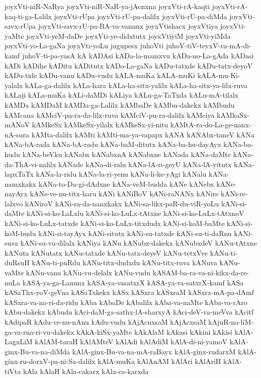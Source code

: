 {joyxVti-niR-NaRya
joyxVti-niR-NaR-ya-jAcnxna
joyxVti-rA-kaqti
joyxVti-rA-kaq-ti-ga-Lalilx
joyxVti-rUpa
joyxVti-rU-pa-dalilx
joyxVti-rU-pa-diMda
joyxVti-savx-rUpa
joyxVti-savx-rU-pa-BA-va-vanunx
joyxVtishacx
joyxVtiya
joyxVti-yaMte
joyxVti-yeM-daDe
joyxVti-ye-didxtutx
joyxVtiyiM
joyxVti-yiMda
joyxVti-yo-La-gaNa
joyxVti-yoLu
jugupesx
juhoVti
juhoV-tiV-teyxV-va-mA-di-kamf
juhoV-ti-pa-yasA
kA
kADAsi
kADa-la-mamxvu
kADa-no-La-gAda
kADasi
kADi
kADihe
kADitu
kADitutx
kADo-La-gaNa
kADu-tatxde
kADu-tatx-deyoV
kADu-tide
kADu-vanu
kADu-vudu
kALA-muKa
kALA-muKi
kALA-mu-Ki-yalalx
kALa-ga-dalilx
kALa-hara
kALa-ha-sitx-yalilx
kALa-ha-sitx-ya-lilx-ruva
kALaji
kALa-muKa
kALi-daMDi
kALiya
kALu-ga-TaTxda
kALu-mA-tilalx
kAMDa
kAMDaM
kAMDa-ga-Lalilx
kAMbaDe
kAMbu-dakekx
kAMbudu
kAMcana
kAMciV-pa-ra-da-lilx-ruva
kAMciV-pu-ra-dalilx
kAMciya
kAMkaSx-mANoV
kAMkeSx
kAMkeSx-yilalx
kAMkeSx-yi-nitu
kAMtA-ra-do-La-ge-nanx-nA-sura
kAMta-dalilx
kAMti
kAMti-ma-ya-vapapx
kANA
kANAbx-taneV
kANa
kANa-bA-rada
kANa-bA-radu
kANa-baM-ditutx
kANa-ba-hu-dayAyx
kANa-ba-hudu
kANa-beVku
kANabx
kANabxnA
kANabxne
kANada
kANa-daMte
kANa-da-ThA-vi-nalilx
kANade
kANa-di-ralu
kANa-lA-ri-geyU
kANa-lA-yitutx
kANa-lapxTaTx
kANa-la-ridu
kANa-la-ri-yenu
kANa-li-ke-yAgi
kANalu
kANa-namxkakx
kANa-to-Da-gi-dAdxne
kANa-veM-budda
kANe
kANebx
kANe-nayAyx
kANe-ve-nu-titx-haru
kANi
kANiBoV
kANi-raNANx
kANire
kANi-re-lalxvo
kANiroV
kANi-sa-da-nanxkakx
kANi-sa-likx-paR-du-viR-yoLu
kANi-si-daMte
kANi-si-ko-LaLxlu
kANi-si-ko-LuLx-tAtxne
kANi-si-ko-LuLx-tAtxnoV
kANi-si-ko-LuLx-tatxde
kANi-si-ko-LuLx-titxdudx
kANi-si-koM-baMte
kANi-si-koM-budu
kANi-si-tayAyx
kANi-situtx
kANi-su-tatxde
kANi-su-ti-daRnu
kANi-suva
kANi-su-vu-dilalx
kANiya
kANu
kANubx-dakekx
kANubxdeV
kANu-tAtxne
kANuta
kANutatx
kANu-tatxde
kANu-tatx-deyeV
kANu-tetxVve
kANu-ti-duRsuH
kANu-ti-puRdu
kANu-titx-dudxdu
kANu-titx-ruva
kANuva
kANu-vaMte
kANu-vanu
kANu-vu-delalx
kANu-vudu
kASAM-ba-ra-va-ni-kikx-da-re-nuLa
kASA-ya-ga-Lanunx
kASA-ya-vasatxrX
kASA-ya-va-satxrX-kamf
kASa
kASaThx-yoV-geVna
kASaTxkekx
kASx
kASxra
kASxraM
kASxra-mA-pa-dAmf
kASxra-va-na-ri-da-ridu
kAba
kAbaDe
kAbalilx
kAba-va-naMte
kAba-va-rAro
kAbu-dakekx
kAbudu
kAci-daM-ga-sathx-lA-sharxyA
kAci-deV-va-meVva
kAcitf
kAdipaR
kAdu-ve-nu-nAnu
kAdu-vudu
kAjAcnxsaM
kAjAcxsaM
kAjuR-na-liM-ga-va-rna-ri-vu-dakekx
kAkA-kiSx-yaMte
kAkAlaM
kAkasi
kAkini
kAkisi
kAlA-LagxLiM
kAlAM-taraH
kAlAMteV
kAlAdi
kAlAdiM
kAlA-di-ni-yamoV
kAlA-ginx-Bu-va-na-diMda
kAlA-ginx-Bu-va-na-mA-raBayx
kAlA-ginx-rudarxM
kAlA-ginx-ru-dorxV-pa-ni-Sa-dalilx
kAlA-muKa
kAlAnAM
kAlAri
kAlAriH
kAlA-tiVta
kAla
kAlaH
kAla-cakarx
kAla-ca-karxda
}
